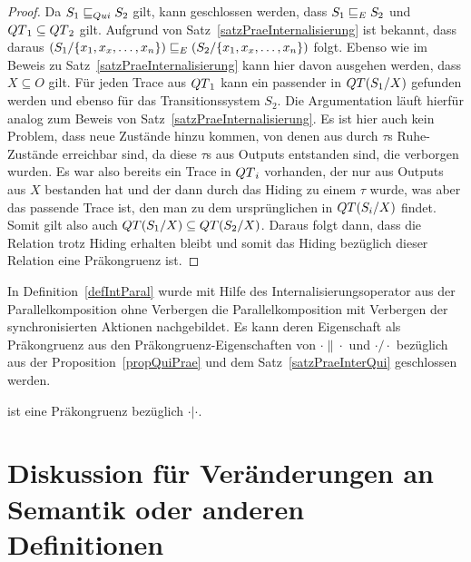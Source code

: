 \begin{proof}
  Da $S_1\sqsubseteq _{Qui} S_2$ gilt, kann geschlossen werden, dass $S_1\sqsubseteq _E S_2$ und $QT{}_1\subseteq
  QT{}_2$ gilt. Aufgrund von
  Satz~\ref{satzPraeInternalisierung} ist bekannt, dass daraus $(S_1/\{x_1,x_x,\dots
  ,x_n\})\sqsubseteq _E (S_2/\{x_1,x_x,\dots ,x_n\})$ folgt. Ebenso wie im Beweis zu
  Satz~\ref{satzPraeInternalisierung} kann hier davon ausgehen werden, dass
  $X\subseteq O$ gilt. Für jeden Trace aus $QT{}_1$ kann ein passender
  in $QT{}(S_1/X)$ gefunden werden und ebenso für das Transitionssystem $S_2$. Die
  Argumentation läuft hierfür analog zum Beweis von
  Satz~\ref{satzPraeInternalisierung}. Es ist hier auch kein Problem, dass
  neue Zustände hinzu kommen, von denen aus durch $\tau$s Ruhe-Zustände
  erreichbar sind, da diese $\tau$s aus Outputs entstanden sind, die verborgen
  wurden. Es war also bereits ein Trace in $QT{}_i$ vorhanden, der nur aus
  Outputs aus $X$ bestanden hat und der dann durch das Hiding zu einem $\tau$
  wurde, was aber das passende Trace ist, den man zu dem ursprünglichen in
  $QT{}(S_i/X)$ findet. Somit gilt
  also auch $QT{}(S_1/X)\subseteq QT{}(S_2/X)$. Daraus folgt dann, dass die
  Relation \QRel{} trotz Hiding erhalten bleibt und somit das Hiding bezüglich
  dieser Relation eine Präkongruenz ist.
\end{proof}

In Definition~\ref{defIntParal} wurde mit Hilfe des Internalisierungsoperator
aus der Parallelkomposition ohne Verbergen die Parallelkomposition mit
Verbergen der synchronisierten Aktionen nachgebildet. Es kann deren
Eigenschaft als Präkongruenz aus den Präkongruenz-Eigenschaften von
$\cdot\|\cdot$ und $\cdot /\cdot$ bezüglich \QRel{} aus der
Proposition~\ref{propQuiPrae} und dem Satz~\ref{satzPraeInterQui} geschlossen
werden.

\begin{kor}
  \QRel{} ist eine Präkongruenz bezüglich $\cdot |\cdot$.
\end{kor}

\section{Diskussion für Veränderungen an Semantik oder anderen Definitionen}


